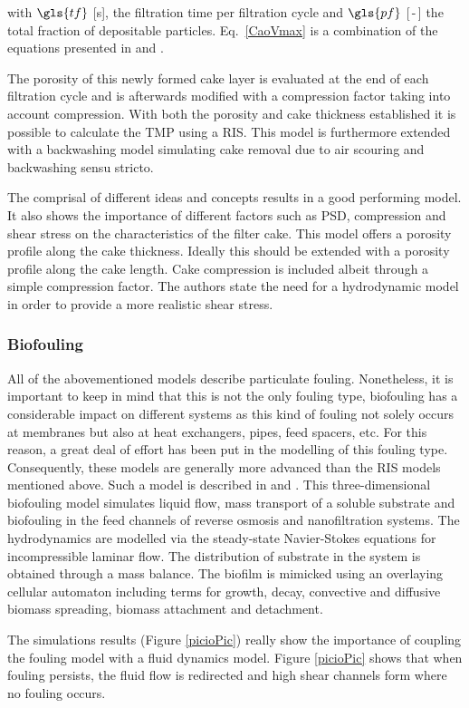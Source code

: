 with $\gls{tf}$ [\unit{\second}], the filtration time per filtration cycle and $\gls{pf}$ [\,-\,] the total fraction of depositable particles. Eq.\ \ref{CaoVmax} is a combination of the equations presented in \cite{Yoon1999} and \cite{Broeckmann2006}. \par 
The porosity of this newly formed cake layer is evaluated at the end of each filtration cycle and is afterwards modified with a compression factor taking into account compression.  With both the porosity and cake thickness established it is possible to calculate the \gls{TMP} using a \gls{RIS}. This model is furthermore extended with a backwashing model simulating cake removal due to air scouring and backwashing sensu stricto. \par
The comprisal of different ideas and concepts results in a good performing model.
It also shows the importance of different factors such as PSD, compression and shear stress on the characteristics of the filter cake. This model offers a porosity profile along the cake thickness. Ideally this should be extended with a porosity profile along the cake length. Cake compression is included albeit through a simple compression factor.
The authors state the need for a hydrodynamic model in order to provide a more realistic shear stress.
\subsubsection{Biofouling}
All of the abovementioned models describe particulate fouling. Nonetheless, it is important to keep in mind that this is not the only fouling type, biofouling has a considerable impact on different systems as this kind of fouling not solely occurs at membranes but also at heat exchangers, pipes, feed spacers, etc. For this reason, a great deal of effort has been put in the modelling of this fouling type. Consequently, these models are generally more advanced than the \gls{RIS} models mentioned above. Such a model is described in \cite{Picioreanu2009} and \cite{Vrouwenvelder2010}. This three-dimensional biofouling model simulates liquid flow, mass transport of a soluble substrate and biofouling in the feed channels of reverse osmosis and nanofiltration systems. The hydrodynamics are modelled via the steady-state Navier-Stokes equations for incompressible laminar flow. The distribution of substrate in the system is obtained through a mass balance. The biofilm is mimicked using an overlaying cellular automaton including terms for growth, decay, convective and diffusive biomass spreading, biomass attachment and detachment. \par
The simulations results (Figure \ref{picioPic}) really show the importance of coupling the fouling model with a fluid dynamics model. Figure \ref{picioPic} shows that when fouling persists, the fluid flow is redirected and high shear channels form where no fouling occurs. \par

